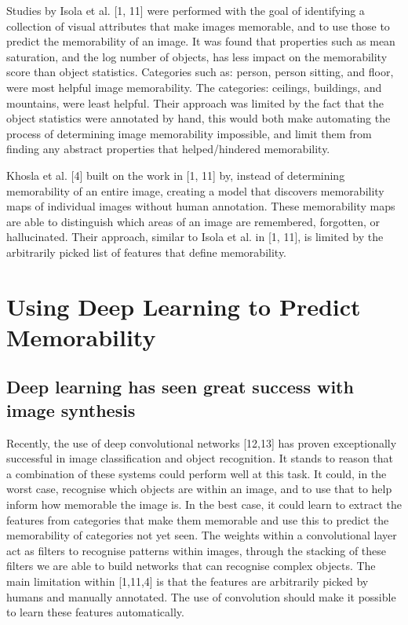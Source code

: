 \documentclass{UoYCSproject}
\begin{document}
Studies by Isola et al. [1, 11] were performed with the goal of identifying a collection of visual attributes that make images memorable, and to use those to predict the memorability of an image. It was found that properties such as mean saturation, and the log number of objects, has less impact on the memorability score than object statistics. 
Categories such as: person, person sitting, and floor, were most helpful image memorability. The categories: ceilings, buildings, and mountains, were least helpful. Their approach was limited by the fact that the object statistics were annotated by hand, this would both make automating the process of determining image memorability impossible, and limit them from finding any abstract properties that helped/hindered memorability.

Khosla et al. [4] built on the work in [1, 11] by, instead of determining memorability of an entire image, creating a model that discovers memorability maps of individual images without human annotation. These memorability maps are able to distinguish which areas of an image are remembered, forgotten, or hallucinated. Their approach, similar to Isola et al. in [1, 11], is limited by the arbitrarily picked list of features that define memorability.

\section{Using Deep Learning to Predict Memorability}


\subsection{Deep learning has seen great success with image synthesis}
Recently, the use of deep convolutional networks [12,13] has proven exceptionally successful in image classification and object recognition. It stands to reason that a combination of these systems could perform well at this task. It could, in the worst case, recognise which objects are within an image, and to use that to help inform how memorable the image is. In the best case, it could learn to extract the features from categories that make them memorable and use this to predict the memorability of categories not yet seen. The weights within a convolutional layer act as filters to recognise patterns within images, through the stacking of these filters we are able to build networks that can recognise complex objects. The main limitation within [1,11,4] is that the features are arbitrarily picked by humans and manually annotated. The use of convolution should make it possible to learn these features automatically.   
\end{document}
